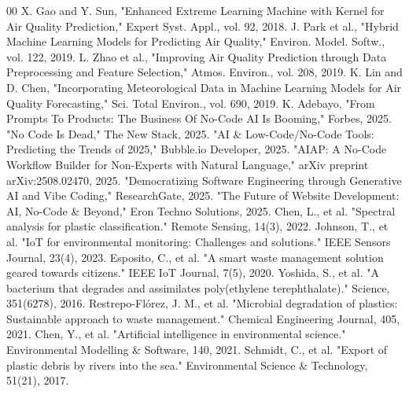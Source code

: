 \documentclass[10pt, conference, letterpaper]{IEEEtran}
\begin{document}
\begin{thebibliography}{00}
 X. Gao and Y. Sun, "Enhanced Extreme Learning Machine with Kernel for Air Quality Prediction," Expert Syst. Appl., vol. 92, 2018.
 J. Park et al., "Hybrid Machine Learning Models for Predicting Air Quality," Environ. Model. Softw., vol. 122, 2019.
 L. Zhao et al., "Improving Air Quality Prediction through Data Preprocessing and Feature Selection," Atmos. Environ., vol. 208, 2019.
 K. Lin and D. Chen, "Incorporating Meteorological Data in Machine Learning Models for Air Quality Forecasting," Sci. Total Environ., vol. 690, 2019.
 K. Adebayo, "From Prompts To Products: The Business Of No-Code AI Is Booming," Forbes, 2025.
 "No Code Is Dead," The New Stack, 2025.
 "AI \& Low-Code/No-Code Tools: Predicting the Trends of 2025," Bubble.io Developer, 2025.
 "AIAP: A No-Code Workflow Builder for Non-Experts with Natural Language," arXiv preprint arXiv:2508.02470, 2025.
 "Democratizing Software Engineering through Generative AI and Vibe Coding," ResearchGate, 2025.
 "The Future of Website Development: AI, No-Code \& Beyond," Eron Techno Solutions, 2025.
 Chen, L., et al. "Spectral analysis for plastic classification." Remote Sensing, 14(3), 2022.
 Johnson, T., et al. "IoT for environmental monitoring: Challenges and solutions." IEEE Sensors Journal, 23(4), 2023.
 Esposito, C., et al. "A smart waste management solution geared towards citizens." IEEE IoT Journal, 7(5), 2020.
 Yoshida, S., et al. "A bacterium that degrades and assimilates poly(ethylene terephthalate)." Science, 351(6278), 2016.
 Restrepo-Flórez, J. M., et al. "Microbial degradation of plastics: Sustainable approach to waste management." Chemical Engineering Journal, 405, 2021.
 Chen, Y., et al. "Artificial intelligence in environmental science." Environmental Modelling \& Software, 140, 2021.
 Schmidt, C., et al. "Export of plastic debris by rivers into the sea." Environmental Science \& Technology, 51(21), 2017.
\end{thebibliography}
\end{document}
